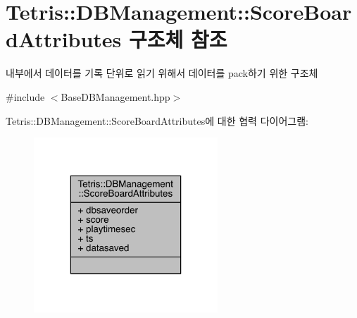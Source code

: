 \hypertarget{struct_tetris_1_1_d_b_management_1_1_score_board_attributes}{}\section{Tetris\+:\+:D\+B\+Management\+:\+:Score\+Board\+Attributes 구조체 참조}
\label{struct_tetris_1_1_d_b_management_1_1_score_board_attributes}


내부에서 데이터를 기록 단위로 읽기 위해서 데이터를 pack하기 위한 구조체  




{\ttfamily \#include $<$Base\+D\+B\+Management.\+hpp$>$}



Tetris\+:\+:D\+B\+Management\+:\+:Score\+Board\+Attributes에 대한 협력 다이어그램\+:
\nopagebreak
\begin{figure}[H]
\begin{center}
\leavevmode
\includegraphics[width=196pt]{struct_tetris_1_1_d_b_management_1_1_score_board_attributes__coll__graph}
\end{center}
\end{figure}
